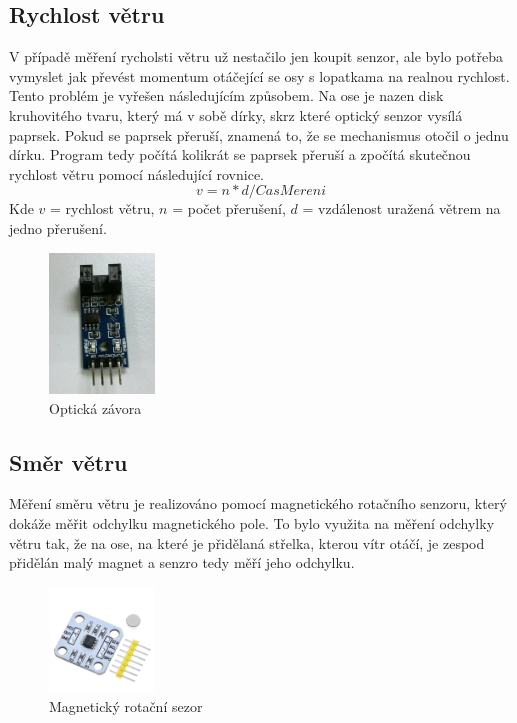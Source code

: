 \subsection{Rychlost větru}
V případě měření rycholsti větru už nestačilo jen koupit senzor, ale bylo potřeba vymyslet jak převést momentum otáčející se osy s lopatkama na realnou rychlost.
Tento problém je vyřešen následujícím způsobem. Na ose je nazen disk kruhovitého tvaru, který má v sobě dírky, skrz které optický senzor vysílá paprsek. Pokud se paprsek přeruší,
znamená to, že se mechanismus otočil o jednu dírku. Program tedy počítá kolikrát se paprsek přeruší a zpočítá skutečnou rychlost větru pomocí následující rovnice.
\begin{equation}
v = n * d / CasMereni 
\end{equation}
Kde $v$ = rychlost větru, $n$ = počet přerušení, $d$ = vzdálenost uražená větrem na jedno přerušení.

\begin{figure}[h] 
    \centering
    \includegraphics[width=0.25\textwidth]{images/ir_sensor.png}
    \caption{Optická závora}
\end{figure}

\subsection{Směr větru}
Měření směru větru je realizováno pomocí magnetického rotačního senzoru, který dokáže měřit odchylku magnetického pole. To bylo využita na měření odchylky větru tak, že na ose, na které je přidělaná střelka, kterou vítr otáčí, je zespod přidělán
malý magnet a senzro tedy měří jeho odchylku.

\begin{figure}[h] 
    \centering
    \includegraphics[width=0.25\textwidth]{images/AS5600.jpg}
    \caption{Magnetický rotační sezor}
\end{figure}

